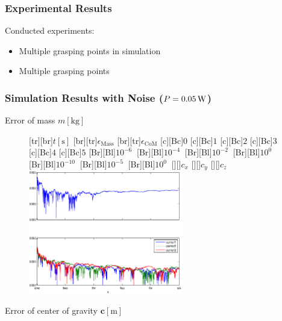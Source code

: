 \documentclass[student,noshadow]{ITRslides}
\renewcommand{\vec}[1]{\boldsymbol{#1}}
\renewcommand{\vec}[1]{\boldsymbol{#1}}
\newcommand{\scr}[1]{\mathrm{#1}}
\begin{document}
\begin{frame}
	\frametitle{Experimental Results}
	Conducted experiments:
	\vspace{0.5cm}
	\begin{itemize}
		\item Multiple grasping points in simulation
		\item Multiple grasping points
	\end{itemize}
\end{frame}

\begin{frame}
	\frametitle{Simulation Results with Noise ($P = \unit[0.05]{W}$)}
	\begin{center}
		Error of mass $m \left[\mathrm{kg}\right]$
		\begin{figure}
			[tr][br]{$t\left[\mathrm{s}\right]$}
			[br][tr]{$\epsilon_\scr{Mass}$}
			[br][tr]{$\epsilon_\scr{CoM}$}
			[c][Bc]{$0$}
			[c][Bc]{$1$}
			[c][Bc]{$2$}
			[c][Bc]{$3$}
			[c][Bc]{$4$}
			[c][Bc]{$5$}
			[Br][Bl]{$10^{-6}\  $}
			[Br][Bl]{$10^{-4}\  $}
			[Br][Bl]{$10^{-2}\  $}
			[Br][Bl]{$10^0\  $}
			[Br][Bl]{$10^{-10}\  $}
			[Br][Bl]{$10^{-5}\  $}
			[Br][Bl]{$10^0\  $}
			[][]{\tiny $c_{x}$}
			[][]{\tiny $c_{y}$}
			[][]{\tiny $c_{z}$}
			\includegraphics[width=0.6\textwidth]{fig/mass_multi_noise.eps}
		\end{figure}
		Error of center of gravity $\vec{c} \left[\mathrm{m}\right]$
	\end{center}
\end{frame}
\end{document}

